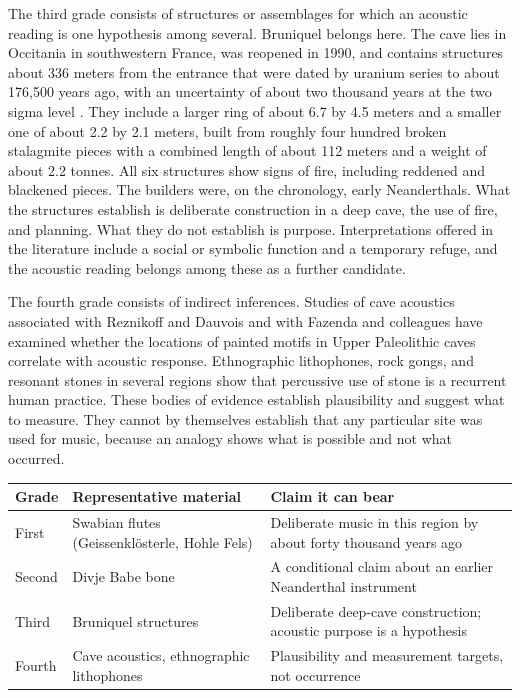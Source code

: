 \documentclass[12pt]{article}
\begin{document}
The third grade consists of structures or assemblages for which an acoustic reading is one hypothesis among several. Bruniquel belongs here. The cave lies in Occitania in southwestern France, was reopened in 1990, and contains structures about 336 meters from the entrance that were dated by uranium series to about 176,500 years ago, with an uncertainty of about two thousand years at the two sigma level \cite{jaubert2016}. They include a larger ring of about 6.7 by 4.5 meters and a smaller one of about 2.2 by 2.1 meters, built from roughly four hundred broken stalagmite pieces with a combined length of about 112 meters and a weight of about 2.2 tonnes. All six structures show signs of fire, including reddened and blackened pieces. The builders were, on the chronology, early Neanderthals. What the structures establish is deliberate construction in a deep cave, the use of fire, and planning. What they do not establish is purpose. Interpretations offered in the literature include a social or symbolic function and a temporary refuge, and the acoustic reading belongs among these as a further candidate.

The fourth grade consists of indirect inferences. Studies of cave acoustics associated with Reznikoff and Dauvois \cite{reznikoff1988} and with Fazenda and colleagues \cite{fazenda2017} have examined whether the locations of painted motifs in Upper Paleolithic caves correlate with acoustic response. Ethnographic lithophones, rock gongs, and resonant stones in several regions show that percussive use of stone is a recurrent human practice. These bodies of evidence establish plausibility and suggest what to measure. They cannot by themselves establish that any particular site was used for music, because an analogy shows what is possible and not what occurred.

\begin{center}
\small
\begin{tabular}{p{}p{}p{}}
\hline
Grade & Representative material & Claim it can bear \\
\hline
First & Swabian flutes (Geissenkl\"osterle, Hohle Fels) & Deliberate music in this region by about forty thousand years ago \\
Second & Divje Babe bone & A conditional claim about an earlier Neanderthal instrument \\
Third & Bruniquel structures & Deliberate deep-cave construction; acoustic purpose is a hypothesis \\
Fourth & Cave acoustics, ethnographic lithophones & Plausibility and measurement targets, not occurrence \\
\hline
\end{tabular}
\end{center}
\end{document}
